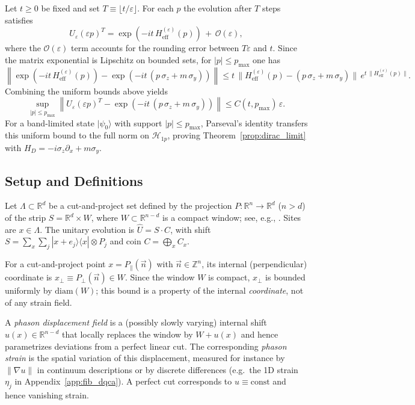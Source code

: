 Let $t\ge 0$ be fixed and set $T\equiv\lfloor t/\varepsilon\rfloor$. For each $p$ the evolution after $T$ steps satisfies
\begin{equation}
    U_\varepsilon(\varepsilon p)^T = \exp\!\left(-it\,H_{\mathrm{eff}}^{(\varepsilon)}(p)\right)\,+\,\mathcal{O}(\varepsilon),
\end{equation}
where the $\mathcal{O}(\varepsilon)$ term accounts for the rounding error between $T\varepsilon$ and $t$. Since the matrix exponential is Lipschitz on bounded sets, for $|p|\le p_{\max}$ one has
\begin{equation}
    \left\|\exp\!\left(-it\,H_{\mathrm{eff}}^{(\varepsilon)}(p)\right)-\exp\!\left(-it\,(p\,\sigma_z+m\,\sigma_y)\right)\right\|
    \le t\,\big\|H_{\mathrm{eff}}^{(\varepsilon)}(p) - (p\,\sigma_z+m\,\sigma_y)\big\|\,e^{t\,\|H_{\mathrm{eff}}^{(\varepsilon)}(p)\|}.
\end{equation}
Combining the uniform bounds above yields
\begin{equation}
    \sup_{|p|\le p_{\max}}\left\|U_\varepsilon(\varepsilon p)^T-\exp\!\left(-it\,(p\,\sigma_z+m\,\sigma_y)\right)\right\|
    \le C(t,p_{\max})\,\varepsilon.
\end{equation}
For a band-limited state $|\psi_0\rangle$ with support $|p|\le p_{\max}$, Parseval's identity transfers this uniform bound to the full norm on $\mathcal{H}_{1p}$, proving Theorem~\ref{prop:dirac_limit} with $H_D=-i\sigma_z\partial_x+m\sigma_y$.

\subsection{Setup and Definitions}
Let $\Lambda \subset \mathbb{R}^d$ be a cut-and-project set defined by the projection $P: \mathbb{R}^n \to \mathbb{R}^d$ ($n > d$) of the strip $S = \mathbb{R}^d \times W$, where $W \subset \mathbb{R}^{n-d}$ is a compact window; see, e.g., \cite{Senechal1995,BaakeGrimm2013AperiodicOrder}.
Sites are $x \in \Lambda$. The unitary evolution is $\hat{U} = S \cdot C$, with shift $S = \sum_x \sum_j |x+e_j\rangle\langle x| \otimes P_j$ and coin $C = \bigoplus_x C_x$.

\begin{definition}
For a cut-and-project point $x=P_{\parallel}(\vec{n})$ with $\vec{n}\in\mathbb{Z}^n$, its internal (perpendicular) coordinate is $x_{\perp}\equiv P_{\perp}(\vec{n})\in W$. Since the window $W$ is compact, $x_{\perp}$ is bounded uniformly by $\mathrm{diam}(W)$; this bound is a property of the internal \emph{coordinate}, not of any strain field.

A \emph{phason displacement field} is a (possibly slowly varying) internal shift $u(x)\in\mathbb{R}^{n-d}$ that locally replaces the window by $W+u(x)$ and hence parametrizes deviations from a perfect linear cut. The corresponding \emph{phason strain} is the spatial variation of this displacement, measured for instance by $\|\nabla u\|$ in continuum descriptions or by discrete differences (e.g.\ the 1D strain $\eta_j$ in Appendix~\ref{app:fib_dqca}). A perfect cut corresponds to $u\equiv\mathrm{const}$ and hence vanishing strain.
\end{definition}

